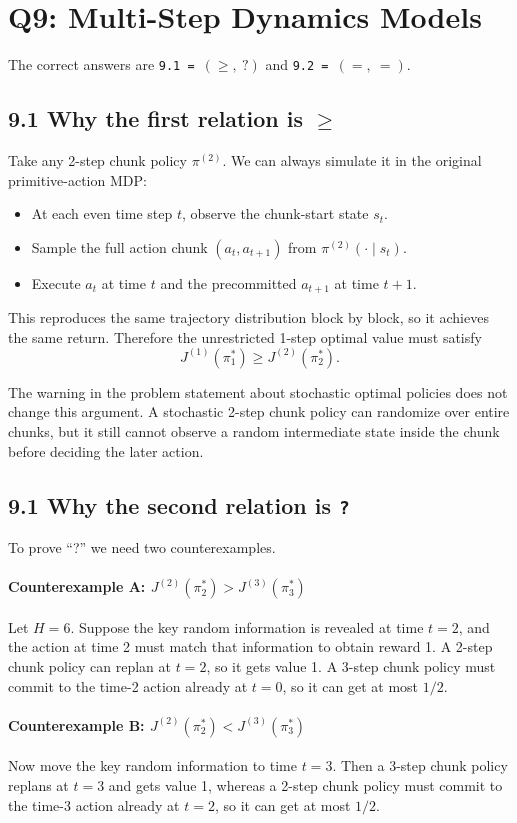 \documentclass[11pt]{article}
\newcommand{\1}{\mathbf{1}}
\begin{document}
\section{Q9: Multi-Step Dynamics Models}
The correct answers are \texttt{9.1 = $(\ge,\ ?)$} and \texttt{9.2 = $(=,\ =)$}.

\subsection*{9.1 Why the first relation is $\ge$}
Take any 2-step chunk policy $\pi^{(2)}$. We can always simulate it in the original primitive-action MDP:
\begin{itemize}[leftmargin=2em]
\item At each even time step $t$, observe the chunk-start state $s_t$.
\item Sample the full action chunk $(a_t,a_{t+1})$ from $\pi^{(2)}(\cdot\mid s_t)$.
\item Execute $a_t$ at time $t$ and the precommitted $a_{t+1}$ at time $t+1$.
\end{itemize}
This reproduces the same trajectory distribution block by block, so it achieves the same return. Therefore the unrestricted 1-step optimal value must satisfy
\[
J^{(1)}(\pi_1^*)\ge J^{(2)}(\pi_2^*).
\]

The warning in the problem statement about stochastic optimal policies does not change this argument. A stochastic 2-step chunk policy can randomize over entire chunks, but it still cannot observe a random intermediate state inside the chunk before deciding the later action.

\subsection*{9.1 Why the second relation is \texttt{?}}
To prove ``?'' we need two counterexamples.

\paragraph{Counterexample A: $J^{(2)}(\pi_2^*)>J^{(3)}(\pi_3^*)$}
Let $H=6$. Suppose the key random information is revealed at time $t=2$, and the action at time 2 must match that information to obtain reward 1. A 2-step chunk policy can replan at $t=2$, so it gets value 1. A 3-step chunk policy must commit to the time-2 action already at $t=0$, so it can get at most $1/2$.

\paragraph{Counterexample B: $J^{(2)}(\pi_2^*)<J^{(3)}(\pi_3^*)$}
Now move the key random information to time $t=3$. Then a 3-step chunk policy replans at $t=3$ and gets value 1, whereas a 2-step chunk policy must commit to the time-3 action already at $t=2$, so it can get at most $1/2$.
\end{document}
